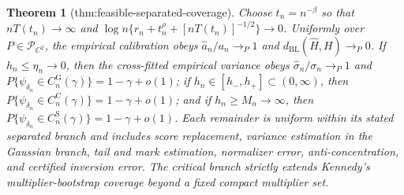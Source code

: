 \documentclass{article}
\newtheorem{theorem}{Theorem}
\begin{document}
\begin{theorem}[thm:feasible-separated-coverage]\label{thm:feasible-separated-coverage}
Choose \(t_n=n^{-\beta}\) so that \(nT(t_n)\to\infty\) and \(\log n\{r_n+t_n^\rho+[nT(t_n)]^{-1/2}\}\to0\). Uniformly over \(P\in\mathcal P_{C^2}\), the empirical calibration obeys \(\widehat a_n/a_n\to_P1\) and \(d_{\mathrm{BL}}(\widehat H,H)\to_P0\). If \(h_n\leq\eta_n\to0\), then the cross-fitted empirical variance obeys \(\widehat\sigma_n/\sigma_n\to_P1\) and \(P\{\psi_{\delta_n}\in C_n^{\mathrm G}(\gamma)\}=1-\gamma+o(1)\); if \(h_n\in[h_-,h_+]\subset(0,\infty)\), then \(P\{\psi_{\delta_n}\in C_n^{\mathrm C}(\gamma)\}=1-\gamma+o(1)\); and if \(h_n\geq M_n\to\infty\), then \(P\{\psi_{\delta_n}\in C_n^{\mathrm S}(\gamma)\}=1-\gamma+o(1)\). Each remainder is uniform within its stated separated branch and includes score replacement, variance estimation in the Gaussian branch, tail and mark estimation, normalizer error, anti-concentration, and certified inversion error. The critical branch strictly extends Kennedy's multiplier-bootstrap coverage beyond a fixed compact multiplier set.
\end{theorem}
\end{document}

